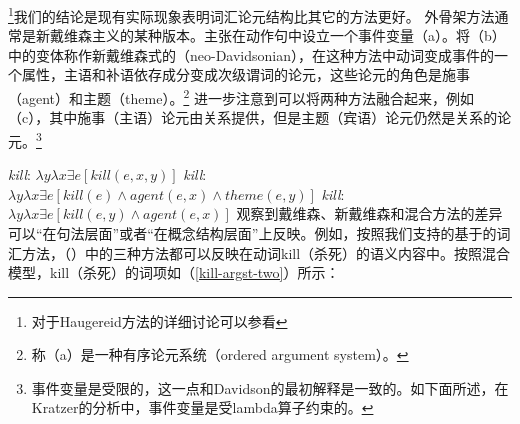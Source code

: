 \footnote{
对于Haugereid方法的详细讨论可以参看%
}我们的结论是现有实际现象表明词汇论元结构比其它的方法更好。 
外骨架方法通常是新戴维森主义的某种版本。\citet{Davidson67a-u}主张在动作句中设立一个事件变量（a）。\citet{Dowty89b-u}将（b）中的变体称作新戴维森式的（neo-Davidsonian），在这种方法中动词变成事件的一个属性，主语和补语依存成分变成次级谓词的论元，这些论元的角色是施事（agent）和主题（theme）。\footnote{
\citet{Dowty89b-u}称（a）是一种有序论元系统（ordered argument system）。
} \citet{Kratzer96a}进一步注意到可以将两种方法融合起来，例如（c），其中施事（主语）论元由关系提供，但是主题（宾语）论元仍然是关系的论元。\footnote{%
事件变量是受限的，这一点和Davidson的最初解释是一致的。如下面所述，在Kratzer的分析中，事件变量是受lambda算子约束的。} 

\eal\settowidth{} \label{neokill1}
\ex \emph{kill}: $\lambda y\lambda x\exists e[kill(e, x, y)]$  
\ex \emph{kill}: $\lambda y\lambda x\exists e[kill(e) \wedge agent(e, x) \wedge theme(e, y)]$ 
\ex \emph{kill}: $\lambda y\lambda x\exists e[kill(e,y) \wedge agent(e, x)]$ 
\zl
\citet{Kratzer96a}观察到戴维森、新戴维森和混合方法的差异可以“在句法层面”或者“在概念结构层面”上反映\citep[--111]{Kratzer96a}。例如，按照我们支持的基于的词汇方法，（）中的三种方法都可以反映在动词kill（杀死）的语义内容中。按照混合模型，kill（杀死）的词项如（\ref{kill-argst-two}）所示：

